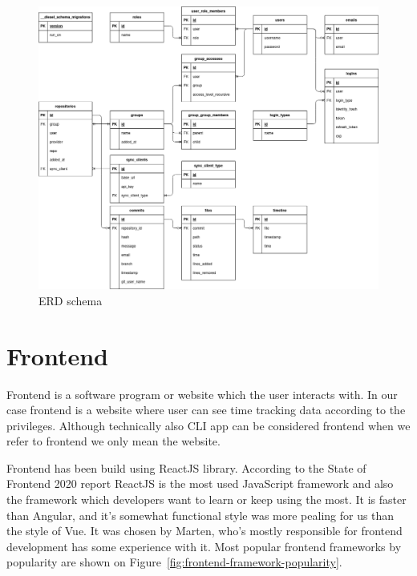 \begin{figure}[H]
    \includegraphics[width=\textwidth]{figures/erd_schema}
    \caption{ERD schema}
    \label{fig:erd-schema}
\end{figure}

\section{Frontend}\label{sec:frontend}
Frontend is a software program or website which the user interacts with.
In our case frontend is a website where user can see time tracking data according to the privileges.
Although technically also CLI app can be considered frontend when we refer to frontend we only mean the website.

Frontend has been build using ReactJS library.
According to the State of Frontend 2020 report ReactJS is the most used JavaScript framework and also the framework which developers want to learn or keep using the most.
It is faster than Angular, and it's somewhat functional style was more pealing for us than the style of Vue.
It was chosen by Marten, who's mostly responsible for frontend development has some experience with it.
Most popular frontend frameworks by popularity are shown on Figure~\ref{fig:frontend-framework-popularity}.

